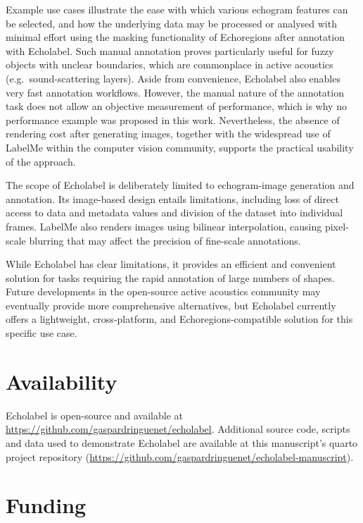\documentclass[
  number,
  preprint,
  3p]{elsarticle}
\begin{document}
Example use cases illustrate the ease with which various echogram
features can be selected, and how the underlying data may be processed
or analysed with minimal effort using the masking functionality of
Echoregions after annotation with Echolabel. Such manual annotation
proves particularly useful for fuzzy objects with unclear boundaries,
which are commonplace in active acoustics (e.g.~sound-scattering
layers). Aside from convenience, Echolabel also enables very fast
annotation workflows. However, the manual nature of the annotation task
does not allow an objective measurement of performance, which is why no
performance example was proposed in this work. Nevertheless, the absence
of rendering cost after generating images, together with the widespread
use of LabelMe within the computer vision community, supports the
practical usability of the approach.

The scope of Echolabel is deliberately limited to echogram-image
generation and annotation. Its image-based design entails limitations,
including loss of direct access to data and metadata values and division
of the dataset into individual frames. LabelMe also renders images using
bilinear interpolation, causing pixel-scale blurring that may affect the
precision of fine-scale annotations.

While Echolabel has clear limitations, it provides an efficient and
convenient solution for tasks requiring the rapid annotation of large
numbers of shapes. Future developments in the open-source active
acoustics community may eventually provide more comprehensive
alternatives, but Echolabel currently offers a lightweight,
cross-platform, and Echoregions-compatible solution for this specific
use case.

\section*{Availability}\label{availability}

Echolabel is open-source and available at
\url{https://github.com/gaspardringuenet/echolabel}. Additional source
code, scripts and data used to demonstrate Echolabel are available at
this manuscript's quarto project repository
(\url{https://github.com/gaspardringuenet/echolabel-manuscript}).

\section*{Funding}\label{funding}
\end{document}
